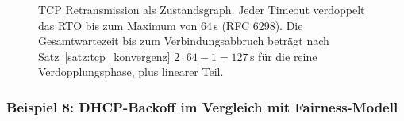 ﻿\documentclass[a4paper,12pt]{article}
\theoremstyle{definition}
\begin{document}
\begin{figure}[H]
\caption{TCP Retransmission als Zustandsgraph. Jeder Timeout verdoppelt
  das RTO bis zum Maximum von 64\,s (RFC 6298). Die Gesamtwartezeit
  bis zum Verbindungsabbruch beträgt nach Satz~\ref{satz:tcp_konvergenz}
  $2 \cdot 64 - 1 = 127\,\mathrm{s}$ für die reine Verdopplungsphase,
  plus linearer Teil.}
\label{fig:tikz_eb2}
\end{figure}

\subsubsection{Beispiel 8: DHCP-Backoff im Vergleich mit Fairness-Modell}
\end{document}
